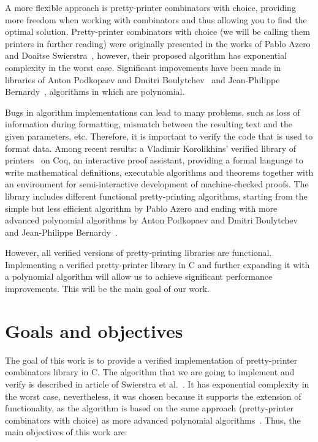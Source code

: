 \documentclass[14pt]{constructor-diploma}
\begin{document}
A more flexible approach is pretty-printer combinators with choice,
providing more freedom when working with combinators and thus allowing you to find the optimal solution.
Pretty-printer combinators with choice (we will be calling them printers in further reading) were originally presented in the works of Pablo Azero and Doaitse Swierstra~\cite{azero, swierstra}, 
however, their proposed algorithm has exponential complexity in the worst case. Significant impovements have been made in 
libraries of Anton Podkopaev and Dmitri Boulytchev~\cite{podkopaev} and Jean-Philippe Bernardy~\cite{bernardy}, algorithms in which are polynomial.

Bugs in algorithm implementations can lead to many problems, such as loss of information during formatting,
mismatch between the resulting text and the given parameters, etc. Therefore, it is important to verify 
the code that is used to format data.
Among recent results: a Vladimir Korolikhins' verified library of printers~\cite{korolihin} on Coq, an interactive proof assistant, 
providing a formal language to write mathematical definitions, executable algorithms and theorems together with an environment for semi-interactive development of machine-checked proofs. 
The library includes different functional pretty-printing algorithms,
starting from the simple but less efficient algorithm by Pablo Azero and ending 
with more advanced polynomial algorithms by Anton Podkopaev and Dmitri Boulytchev~\cite{podkopaev} and Jean-Philippe Bernardy~\cite{bernardy}.

However, all verified versions of pretty-printing libraries are functional. 
Implementing a verified pretty-printer library in C and further expanding it with a polynomial algorithm 
will allow us to achieve significant performance improvements. This will be the main goal of our work.

\section{Goals and objectives}
The goal of this work is to provide a verified implementation of pretty-printer combinators library in C. 
The algorithm that we are going to implement and verify 
is described in article of Swierstra et al.~\cite{swierstra}. 
It has exponential complexity in the worst case, nevertheless, 
it was chosen because it supports the extension of functionality, 
as the algorithm is based on the same approach (pretty-printer combinators with choice) 
as more advanced polynomial algorithms~\cite{podkopaev,bernardy}. Thus, the main objectives of this work are:
\end{document}
